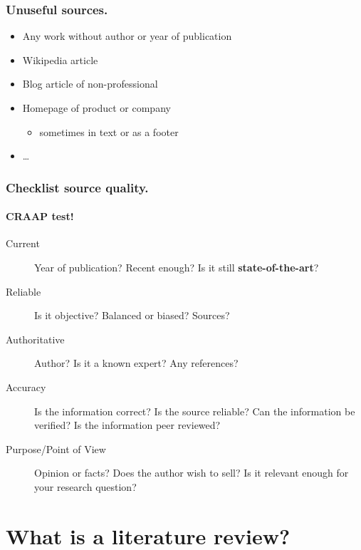 \documentclass[aspectratio=169]{beamer}
\begin{document}
\begin{frame}
    \frametitle{Unuseful sources.}

    \begin{itemize}
        \item Any work without author or year of publication
        \item Wikipedia article
        \item Blog article of non-professional
        \item Homepage of product or company
              \begin{itemize}
                  \item sometimes in text or as a footer
              \end{itemize}
        \item \dots
    \end{itemize}
\end{frame}

\begin{frame}
    \frametitle{Checklist source quality.}
    \framesubtitle{CRAAP test!}

    \begin{description}
        \item[Current] Year of publication? Recent enough? Is it still \textbf{state-of-the-art}?
        \item[Reliable] Is it objective? Balanced or biased? Sources?
        \item[Authoritative] Author? Is it a known expert? Any references?
        \item[Accuracy] Is the information correct? Is the source reliable? Can the information be verified? Is the information peer reviewed?
        \item[Purpose/Point of View] Opinion or facts? Does the author wish to sell? Is it relevant enough for your research question?
    \end{description}

\end{frame}



\section{What is a literature review?}
\end{document}
